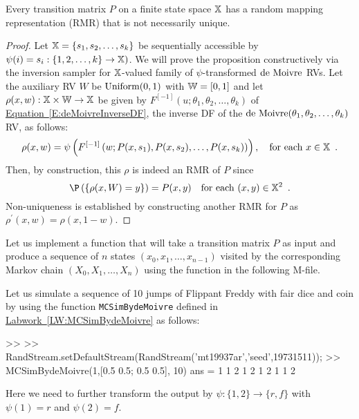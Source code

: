 \begin{prop}
Every transition matrix $P$ on a finite state space $\mathbb{X}$ has a random mapping representation (RMR) that is not necessarily unique.
\begin{proof}
Let $\mathbb{X} = \{s_1,s_2,\ldots,s_k\}$ be sequentially accessible by $\psi(i)=s_i :  \{1,2,\ldots,k\} \to \mathbb{X})$.   We will prove the proposition constructively via the inversion sampler for $\mathbb{X}$-valued family of $\psi$-transformed $\mbox{{\rm de~Moivre}}$ RVs.  Let the auxiliary RV $W$ be $\mbox{{\rm Uniform}}(0,1)$ with $\mathbb{W}=[0,1]$ and let $\rho(x,w): \mathbb{X} \times \mathbb{W} \to \mathbb{X}$ be given by $F^{[-1]}(u;\theta_1,\theta_2,\ldots,\theta_k)$ of \hyperref[E:deMoivreInverseDF]{Equation~\ref*{E:deMoivreInverseDF}}, the inverse DF of the $\mbox{{\rm de~Moivre}}(\theta_1,\theta_2,\ldots,\theta_k)$ RV, as follows:
\[
\rho(x,w) = \psi \left( F^{[-1]}\left(w; P(x,s_1), P(x,s_2), \ldots, P(x,s_k) \right) \right), \quad \text{for each } x \in \mathbb{X} \enspace .
\]
Then, by construction, this $\rho$ is indeed an RMR of $P$ since
\[
\P \left( \{ \rho(x,W)=y \} \right) = P(x,y) \quad \text{for each } (x,y) \in \Xz^2 \enspace .
\]
Non-uniqueness is established by constructing another RMR for $P$ as $\rho^\prime(x,w) = \rho(x,1-w)$.
\end{proof}
\end{prop}

\begin{labwork}\label{LW:MCSimBydeMoivre}
Let us implement a function that will take a transition matrix $P$ as input and produce a sequence of $n$ states $(x_0,x_1,\ldots,x_{n-1})$ visited by the corresponding Markov chain $(X_0,X_1,\ldots, X_n)$ using the function in the following M-file.
\end{labwork}

\begin{simulation}\label{SIM:FlippantFreddyByMCSimBydeMoivre}
Let us simulate a sequence of 10 jumps of Flippant Freddy with fair dice and coin by using the function {\tt MCSimBydeMoivre} defined in \hyperref[LW:MCSimBydeMoivre]{Labwork~\ref*{LW:MCSimBydeMoivre}} as follows:
\begin{VrbM}
>> %
>> RandStream.setDefaultStream(RandStream('mt19937ar','seed',19731511));
>> MCSimBydeMoivre(1,[0.5 0.5; 0.5 0.5], 10)
ans =     1     1     2     1     2     1     2     1     1     2
\end{VrbM}
Here we need to further transform the output by $\psi: \{1,2\} \to \{r,f\}$ with $\psi(1)=r$ and $\psi(2)=f$.
\end{simulation}

